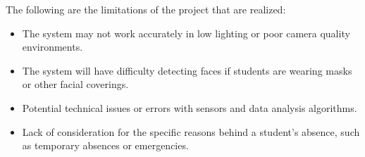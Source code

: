 The following are the limitations of the project that are realized:
\begin{itemize}
 	
        \item The system may not work accurately in low lighting or poor camera quality environments.
        \item The system will have difficulty detecting faces if students are wearing masks or other facial coverings.
        \item Potential technical issues or errors with sensors and data analysis algorithms.
	\item Lack of consideration for the specific reasons behind a student's absence, such as temporary absences or emergencies.


 \end{itemize}